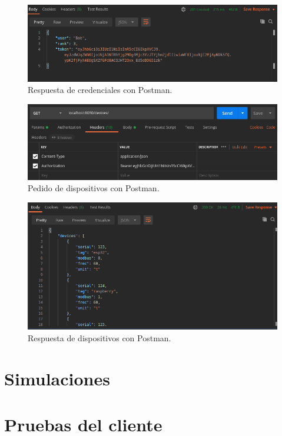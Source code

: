 \begin{figure}[h]
	\centering
	\includegraphics[width=\textwidth]{./Figures/postman2.png}
	\caption{Respuesta de credenciales con Postman.}
	\label{fig:ch3Postman2}
\end{figure}

\begin{figure}[h]
	\centering
	\includegraphics[width=\textwidth]{./Figures/postman3.png}
	\caption{Pedido de dispositivos con Postman.}
	\label{fig:ch3Postman3}
\end{figure}

\begin{figure}[h]
	\centering
	\includegraphics[width=\textwidth]{./Figures/postman4.png}
	\caption{Respuesta de dispositivos con Postman.}
	\label{fig:ch3Postman4}
\end{figure}

\section{Simulaciones}

\section{Pruebas del cliente}
